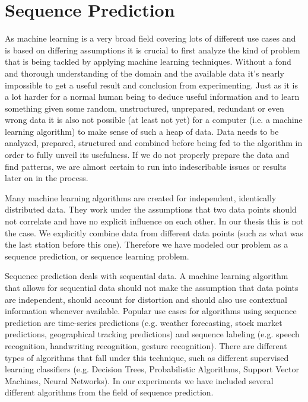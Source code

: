 \section{Sequence Prediction}
As machine learning is a very broad field covering lots of different use cases and is based on differing assumptions it is crucial to first analyze the kind of problem that is being tackled by applying machine learning techniques. Without a fond and thorough understanding of the domain and the available data it's nearly impossible to get a useful result and conclusion from experimenting. Just as it is a lot harder for a normal human being to deduce useful information and to learn something given some random, unstructured, unprepared, redundant or even wrong data it is also not possible (at least not yet) for a computer (i.e. a machine learning algorithm) to make sense of such a heap of data. Data needs to be analyzed, prepared, structured and combined before being fed to the algorithm in order to fully unveil its usefulness. If we do not properly prepare the data and find patterns, we are almost certain to run into indescribable issues or results later on in the process. \cite{DataMining} 

Many machine learning algorithms are created for independent, identically distributed data.\cite{MachineLearningTUMunich} They work under the assumptions that two data points should not correlate and have no explicit influence on each other. In our thesis this is not the case. We explicitly combine data from different data points (such as what was the last station before this one). Therefore we have modeled our problem as a sequence prediction, or sequence learning problem.

Sequence prediction deals with sequential data. A machine learning algorithm that allows for sequential data should not make the assumption that data points are independent, should account for distortion and should also use contextual information whenever available. Popular use cases for algorithms using sequence prediction are time-series predictions (e.g. weather forecasting, stock market predictions, geographical tracking predictions) and sequence labeling (e.g. speech recognition, handwriting recognition, gesture recognition). There are different types of algorithms that fall under this technique, such as different supervised learning classifiers (e.g. Decision Trees, Probabilistic Algorithms, Support Vector Machines, Neural Networks). In our experiments we have included several different algorithms from the field of sequence prediction.

